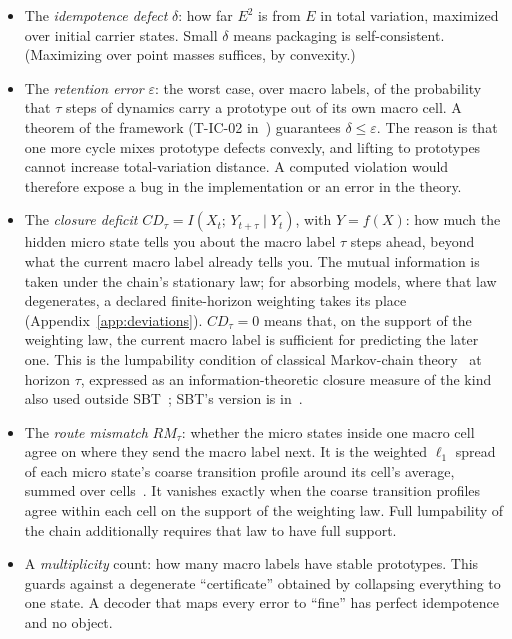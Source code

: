 \begin{itemize}
\item The \emph{idempotence defect} $\delta$: how far $E^2$ is from $E$ in total variation, maximized over initial carrier states. Small $\delta$ means packaging is self-consistent. (Maximizing over point masses suffices, by convexity.)
\item The \emph{retention error} $\varepsilon$: the worst case, over macro labels, of the probability that $\tau$ steps of dynamics carry a prototype out of its own macro cell. A theorem of the framework (T-IC-02 in~\cite{sbt-f1}) guarantees $\delta \le \varepsilon$. The reason is that one more cycle mixes prototype defects convexly, and lifting to prototypes cannot increase total-variation distance. A computed violation would therefore expose a bug in the implementation or an error in the theory.
\item The \emph{closure deficit} $CD_\tau = I(X_t;\, Y_{t+\tau} \mid Y_t)$, with $Y = f(X)$: how much the hidden micro state tells you about the macro label $\tau$ steps ahead, beyond what the current macro label already tells you. The mutual information is taken under the chain's stationary law; for absorbing models, where that law degenerates, a declared finite-horizon weighting takes its place (Appendix~\ref{app:deviations}). $CD_\tau = 0$ means that, on the support of the weighting law, the current macro label is sufficient for predicting the later one. This is the lumpability condition of classical Markov-chain theory~\cite{kemeny1960finite,buchholz1994lumpability} at horizon $\tau$, expressed as an information-theoretic closure measure of the kind also used outside SBT~\cite{pfante2014closure}; SBT's version is in~\cite{sbt-f3,sbt-ng,sbt-cast}.
\item The \emph{route mismatch} $RM_\tau$: whether the micro states inside one macro cell agree on where they send the macro label next. It is the weighted $\ell_1$ spread of each micro state's coarse transition profile around its cell's average, summed over cells~\cite{sbt-xor}. It vanishes exactly when the coarse transition profiles agree within each cell on the support of the weighting law. Full lumpability of the chain additionally requires that law to have full support.
\item A \emph{multiplicity} count: how many macro labels have stable prototypes. This guards against a degenerate ``certificate'' obtained by collapsing everything to one state. A decoder that maps every error to ``fine'' has perfect idempotence and no object.
\end{itemize}

